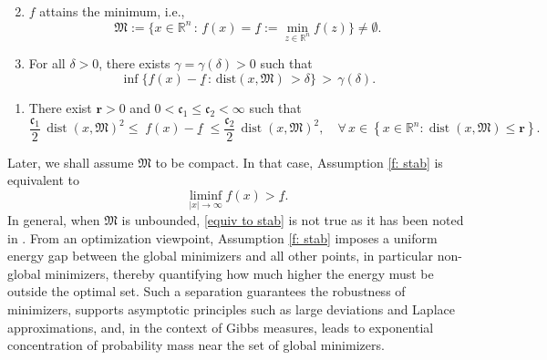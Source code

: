 \documentclass[12pt]{amsart}
\numberwithin{equation}{section}
\theoremstyle{plain}
\begin{document}
\begin{enumerate}[label=\textbf{(A\arabic*)}]
\setcounter{enumi}{1}
\item\label{f: has min} $f$ attains the minimum, i.e.,  
  \begin{equation*}
    \mathfrak{M}:=\{x\in\mathbb{R}^{n}\,:\, f(x) = \underline{f}:= \min\limits_{z\in\mathbb{R}^{n}}f(z)\} \ne \emptyset .
\end{equation*}
\item\label{f: stab} For all $\delta>0$, there exists  $\gamma=\gamma(\delta)>0$ such that
    \begin{equation*}
         \inf\{f(x) - \underline{f}\,:\,\text{dist}(x,\mathfrak{M})\,> \delta\} \,>\, \gamma(\delta).
    \end{equation*}
\end{enumerate}

\begin{enumerate}[label=\textbf{(D)}]
    \item\label{QG} There exist $\mathbf{r}>0$  and $0<\mathfrak{c}_{1}\leq \mathfrak{c}_{2}<\infty$  such that
    \begin{equation*}
    \frac{\mathfrak{c}_{1}}{2} \, \operatorname{dist}(x,\mathfrak M)^2 \leq \; f(x) - \underline{f} \; \leq  \frac{\mathfrak{c}_{2}}{2} \, \operatorname{dist}(x,\mathfrak M)^2, \quad\forall\,x \in \left\{x\in\mathbb{R}^{n}: \operatorname{dist}(x,\mathfrak{M})\leq \mathbf{r}\right\}.
    \end{equation*}
\end{enumerate}

Later, we shall assume $\mathfrak{M}$ to be compact. In that case, Assumption \ref{f: stab} is equivalent to 
\begin{equation}\label{equiv to stab}
    \liminf\limits_{|x|\to \infty} f(x)> \underline{f}.
\end{equation}
In general, when $\mathfrak{M}$ is unbounded, \eqref{equiv to stab} is not true as it has been noted in \cite{bardi2023eikonal}. From an optimization viewpoint, Assumption \ref{f: stab} imposes a uniform energy gap between the global minimizers and all other points, in particular non-global minimizers, thereby quantifying how much higher the energy must be outside the optimal set. Such a separation guarantees the robustness of minimizers, supports asymptotic principles such as large deviations and Laplace approximations, and, in the context of Gibbs measures, leads to exponential concentration of probability mass near the set of global minimizers.
\end{document}

